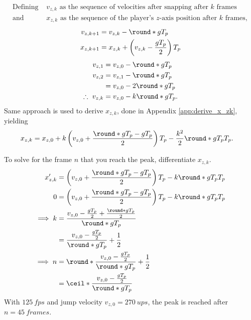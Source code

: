\begin{align*}
\text{Defining }&v_{z,k}\text{ as the sequence of velocities after snapping after $k$ frames}\\
\text{and }&x_{z,k}\text{ as the sequence of the player's $z$-axis position after $k$ frames},
\end{align*}
\begin{align}
\label{eq:v_zk+1}
v_{z,k+1} &= v_{z,k} - \round*{gT_p}\\
\label{eq:x_zk+1}
x_{z,k+1} &= x_{z,k} + \left(v_{z,k} - \frac{gT_p}{2} \right) T_p
\end{align}
\begin{align}
\nonumber
v_{z,1} &= v_{z,0} - \round*{gT_p}\\\nonumber
v_{z,2} &= v_{z,1} - \round*{gT_p}\\\nonumber
&= v_{z,0} - 2\round*{gT_p}\\
\label{eq:v_zk}
\therefore\ v_{z,k} &= v_{z,0} - k\round*{gT_p}.
\end{align}
Same approach is used to derive $x_{z,k}$, done in Appendix \ref{app:derive_x_zk}, yielding
\begin{align}
\label{eq:x_zk}
x_{z,k} &= x_{z,0} + k\left(v_{z,0} + \frac{\round*{gT_p} - gT_p}{2} \right) T_p - \frac{k^2}{2} \round*{gT_p} T_p.
\end{align}

To solve for the frame $n$ that you reach the peak, differentiate $x_{z,k}$.
\begin{align*}
x_{z,k}' &= \left(v_{z,0} + \frac{\round*{gT_p} - gT_p}{2} \right) T_p - k\round*{gT_p} T_p\\
0 &= \left(v_{z,0} + \frac{\round*{gT_p} - gT_p}{2} \right) T_p - k\round*{gT_p} T_p\\
\implies k &= \frac{v_{z,0} - \frac{gT_p}{2} + \frac{\round*{gT_p}}{2}}{\round*{gT_p}}\\
&= \frac{v_{z,0} - \frac{gT_p}{2}}{\round*{gT_p}} + \frac{1}{2}\\
\implies n &= \round*{\frac{v_{z,0} - \frac{gT_p}{2}}{\round*{gT_p}} + \frac{1}{2}}\\
&= \ceil*{\frac{v_{z,0} - \frac{gT_p}{2}}{\round*{gT_p}}}
\end{align*}
With $\qty{125}{fps}$ and jump velocity $v_{z,0} = \qty{270}{ups}$, the peak is reached after $n = \qty{45}{frames}$.\\

